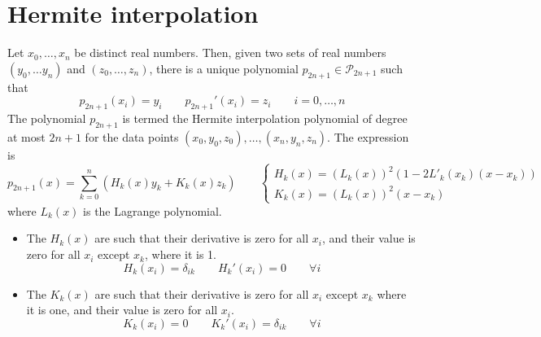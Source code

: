 \documentclass[12pt, openany]{report}
\theoremstyle{definition}
\begin{document}
\section{Hermite interpolation}
Let \(x_0,\dots,x_n\) be distinct real numbers. Then, given two sets of real numbers \((y_0,\dots y_n)\) and \((z_0,\dots,z_n)\), there is a unique polynomial \(p_{2n+1}\in \mathcal{P}_{2n+1}\) such that 
\begin{equation}
    p_{2n+1} (x_i) = y_i \qquad p_{2n+1}'(x_i) =z_i \qquad i=0,\dots,n
\end{equation}
The polynomial \(p_{2n+1}\) is termed the Hermite interpolation polynomial of degree at most \(2n+1\) for the data points \((x_0,y_0,z_0),\dots,(x_n,y_n,z_n)\). The expression is 
\begin{equation}
    p_{2n+1}(x) = \sum_{k=0}^n \left(H_k(x)y_k + K_k(x)z_k\right) \qquad \begin{cases}
        H_k(x) = (L_k(x))^2(1-2L'_k(x_k)(x-x_k))\\
        K_k(x) = (L_k(x))^2(x-x_k)
    \end{cases}
\end{equation}
where \(L_k(x)\) is the Lagrange polynomial.
\begin{itemize}
    \item The \(H_k(x)\) are such that their derivative is zero for all \(x_i\), and their value is zero for all \(x_i\) except \(x_k\), where it is 1.\[H_k(x_i) = \delta_{ik}\qquad H_k'(x_i) = 0 \qquad \forall i\]
    \item The \(K_k(x)\) are such that their derivative is zero for all \(x_i\) except \(x_k\) where it is one, and their value is zero for all \(x_i\).\[K_k(x_i) = 0\qquad K_k'(x_i) = \delta_{ik} \qquad \forall i\]
\end{itemize}
\end{document}
